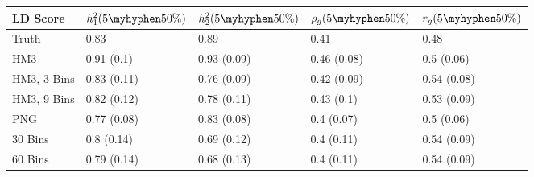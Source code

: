 \begin{table}[ht]
\centering
\begin{tabular}{lllll}
  \hline
LD Score & $h^2_1(5\myhyphen50\%)$ & $h^2_2(5\myhyphen50\%)$ & $\rho_g(5\myhyphen50\%)$ & $r_g(5\myhyphen50\%)$ \\ 
  \hline
Truth & 0.83 & 0.89 & 0.41 & 0.48 \\ 
  HM3 & 0.91 (0.1) & 0.93 (0.09) & 0.46 (0.08) & 0.5 (0.06) \\ 
  HM3, 3 Bins & 0.83 (0.11) & 0.76 (0.09) & 0.42 (0.09) & 0.54 (0.08) \\ 
  HM3, 9 Bins & 0.82 (0.12) & 0.78 (0.11) & 0.43 (0.1) & 0.53 (0.09) \\ 
  PNG & 0.77 (0.08) & 0.83 (0.08) & 0.4 (0.07) & 0.5 (0.06) \\ 
  30 Bins & 0.8 (0.14) & 0.69 (0.12) & 0.4 (0.11) & 0.54 (0.09) \\ 
  60 Bins & 0.79 (0.14) & 0.68 (0.13) & 0.4 (0.11) & 0.54 (0.09) \\ 
   \hline
\end{tabular}
\end{table}
